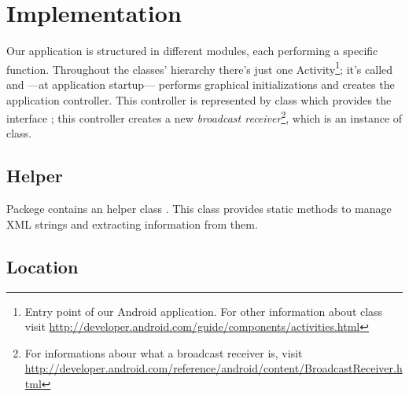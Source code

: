 \section{Implementation}
\label{sec:implementation}

Our application is structured in different modules, each performing a specific function. 
Throughout the classes' hierarchy there's just one Activity\footnote{Entry point of our Android application. For other information about  class visit \url{http://developer.android.com/guide/components/activities.html}}; it's called  and —at application startup— performs graphical initializations and creates the application controller. This controller is represented by  class which provides the interface ; this controller creates a new \textit{broadcast receiver}\footnote{For informations abour what a broadcast receiver is, visit \url{http://developer.android.com/reference/android/content/BroadcastReceiver.html}}, which is an instance of  class.


\subsection{Helper}
Packege  contains an helper class . This class provides static methods to manage XML strings and extracting information from them.

\subsection{Location}

